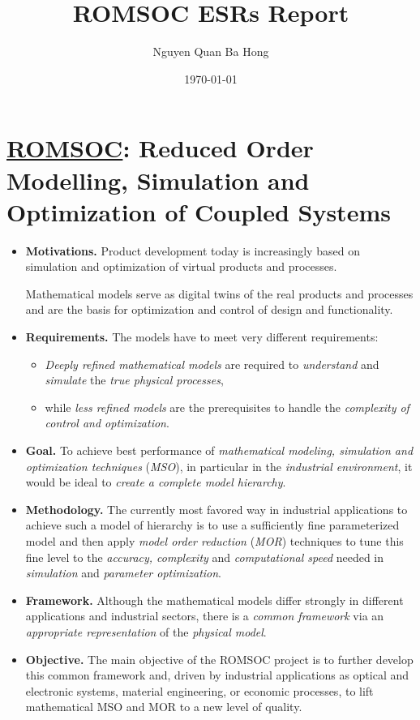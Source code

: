 \documentclass{book}
\title{ROMSOC ESRs Report}
\author{Nguyen Quan Ba Hong}
\date{\today}
\numberwithin{equation}{section}
\begin{document}
\maketitle
\setcounter{secnumdepth}{6}
\setcounter{tocdepth}{6}
\tableofcontents


\chapter*{\href{https://www.romsoc.eu/}{ROMSOC}: Reduced Order Modelling, Simulation and Optimization of Coupled Systems}

\begin{itemize}
    \item \textbf{Motivations.} Product development today is increasingly based on simulation and optimization of virtual products and processes.
    
    Mathematical models serve as digital twins of the real products and processes and are the basis for optimization and control of design and functionality.
    \item \textbf{Requirements.} The models have to meet very different requirements:
    \begin{itemize}
        \item \textit{Deeply refined mathematical models} are required to \textit{understand} and \textit{simulate} the \textit{true physical processes},
        \item while \textit{less refined models} are the prerequisites to handle the \textit{complexity of control and optimization}.
    \end{itemize}
    \item \textbf{Goal.} To achieve best performance of \textit{mathematical modeling, simulation and optimization techniques} (\textit{MSO}), in particular in the \textit{industrial environment}, it would be ideal to \textit{create a complete model hierarchy}.
    \item \textbf{Methodology.} The currently most favored way in industrial applications to achieve such a model of hierarchy is to use a sufficiently fine parameterized model and then apply \textit{model order reduction} (\textit{MOR}) techniques to tune this fine level to the \textit{accuracy, complexity} and \textit{computational speed} needed in \textit{simulation} and \textit{parameter optimization}.
    \item \textbf{Framework.} Although the mathematical models differ strongly in different applications and industrial sectors, there is a \textit{common framework} via an \textit{appropriate representation} of the \textit{physical model}.
    \item \textbf{Objective.} The main objective of the ROMSOC project is to further develop this common framework and, driven by industrial applications as optical and electronic systems, material engineering, or economic processes, to lift mathematical MSO and MOR to a new level of quality.
    

\end{itemize}
\end{document}
